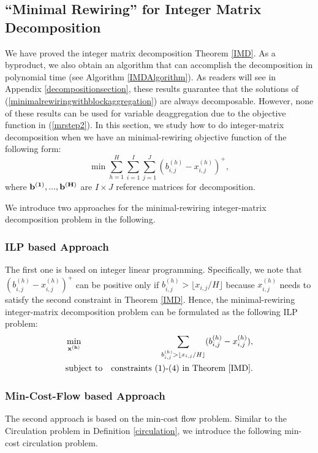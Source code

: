 \documentclass[letterpaper,twocolumn,10pt]{article}
\begin{document}
\subsection{``Minimal Rewiring'' for Integer Matrix Decomposition}
We have proved the integer matrix decomposition Theorem \ref{IMD}. As a byproduct, we also obtain an algorithm that can accomplish the decomposition in polynomial time (see Algorithm \ref{IMDAlgorithm}). As readers will see in Appendix \ref{decompositionsection}, these results guarantee that the solutions of (\ref{minimalrewiringwithblockaggregation}) are always decomposable. However, none of these results can be used for variable deaggregation due to the objective function in (\ref{mrstep2}). In this section, we study how to do integer-matrix decomposition when we have an minimal-rewiring objective function of the following form:
\begin{equation}\label{fakeminimalrewiring}
\min\sum_{h=1}^H\sum_{i=1}^I\sum_{j=1}^J(b_{i,j}^{(h)} - x_{i,j}^{(h)})^+,
\end{equation}
where $\bf b^{(1)},...,\bf b^{(H)}$ are $I\times J$ reference matrices for decomposition.

We introduce two approaches for the minimal-rewiring integer-matrix decomposition problem in the following.

\subsubsection{ILP based Approach}\label{minimalrewireilp}
The first one is based on integer linear programming. Specifically, we note that $(b_{i,j}^{(h)} - x_{i,j}^{(h)})^+$ can be positive only if $b_{i,j}^{(h)} > \lfloor x_{i,j}/{H}\rfloor$ because $x_{i,j}^{(h)}$ needs to satisfy the second constraint in Theorem \ref{IMD}. Hence, the minimal-rewiring integer-matrix decomposition problem can be formulated as the following ILP problem:
\begin{eqnarray}\label{fakeminimalrewiringformulation}
&\min_{{\bf x^{(h)}}}&\sum_{b_{i,j}^{(h)} > \lfloor x_{i,j}/{H}\rfloor}(b_{i,j}^{(h)} - x_{i,j}^{(h)}),\\
&\text{subject to}&\text{constraints (1)-(4) in Theorem \ref{IMD}.}\nonumber
\end{eqnarray}

\subsubsection{Min-Cost-Flow based Approach}\label{deaggregationalgorithmsection}
The second approach is based on the min-cost flow problem. Similar to the Circulation problem in Definition \ref{circulation}, we introduce the following min-cost circulation problem.
\end{document}
